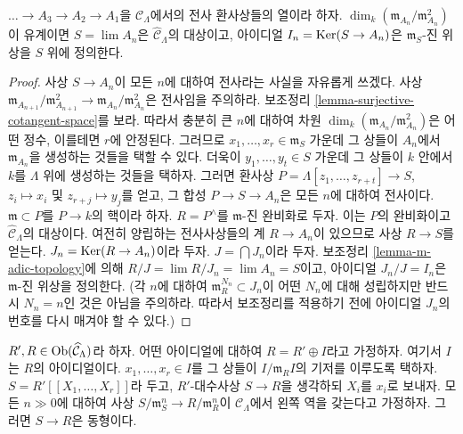 \begin{lemma}
\label{lemma-limit-artinian}
$\ldots \to A_3 \to A_2 \to A_1$을 $\mathcal{C}_\Lambda$에서의
전사 환사상들의 열이라 하자.
$\dim_k (\mathfrak m_{A_n}/\mathfrak m_{A_n}^2)$이 유계이면
$S = \lim A_n$은 $\widehat{\mathcal{C}}_\Lambda$의 대상이고,
아이디얼 $I_n = \mathop{\mathrm{Ker}}(S \to A_n)$은 $\mathfrak m_S$-진 위상을
$S$ 위에 정의한다.
\end{lemma}

\begin{proof}
사상 $S \to A_n$이 모든 $n$에 대하여 전사라는 사실을 자유롭게 쓰겠다.
사상
$\mathfrak m_{A_{n + 1}}/\mathfrak m_{A_{n + 1}}^2 \to
\mathfrak m_{A_n}/\mathfrak m_{A_n}^2$은 전사임을 주의하라.
보조정리 \ref{lemma-surjective-cotangent-space}를 보라.
따라서 충분히 큰 $n$에 대하여 차원
$\dim_k (\mathfrak m_{A_n}/\mathfrak m_{A_n}^2)$은 어떤 정수,
이를테면 $r$에 안정된다.
그러므로 $x_1, \ldots, x_r \in \mathfrak m_S$ 가운데 그 상들이
$A_n$에서 $\mathfrak m_{A_n}$을 생성하는 것들을 택할 수 있다.
더욱이 $y_1, \ldots, y_t \in S$ 가운데 그 상들이 $k$ 안에서
$k$를 $\Lambda$ 위에 생성하는 것들을 택하자. 그러면 환사상
$P = \Lambda[z_1, \ldots, z_{r + t}] \to S$, $z_i \mapsto x_i$ 및
$z_{r + j} \mapsto y_j$를 얻고, 그 합성
$P \to S \to A_n$은 모든 $n$에 대하여 전사이다.
$\mathfrak m \subset P$를 $P \to k$의 핵이라 하자.
$R = P^\wedge$를 $\mathfrak m$-진 완비화로 두자. 이는 $P$의
완비화이고 $\widehat{\mathcal{C}}_\Lambda$의 대상이다.
여전히 양립하는 전사사상들의 계 $R \to A_n$이 있으므로
사상 $R \to S$를 얻는다. $J_n = \mathop{\mathrm{Ker}}(R \to A_n)$이라 두자.
$J = \bigcap J_n$이라 두자. 보조정리
\ref{lemma-m-adic-topology}에 의해
$R/J = \lim R/J_n = \lim A_n = S$이고,
아이디얼 $J_n/J = I_n$은 $\mathfrak m$-진 위상을 정의한다.
(각 $n$에 대하여 $\mathfrak m_R^{N_n} \subset J_n$이 어떤 $N_n$에 대해
성립하지만 반드시 $N_n = n$인 것은
아님을 주의하라. 따라서 보조정리를 적용하기 전에 아이디얼
$J_n$의 번호를 다시 매겨야 할 수 있다.)
\end{proof}

\begin{lemma}
\label{lemma-power-series}
$R', R \in \mathop{\mathrm{Ob}}\nolimits(\widehat{\mathcal{C}}_\Lambda)$라 하자.
어떤 아이디얼에 대하여 $R = R' \oplus I$라고 가정하자.
여기서 $I$는 $R$의 아이디얼이다.
$x_1, \ldots, x_r \in I$를 그 상들이 $I/\mathfrak m_R I$의
기저를 이루도록 택하자. $S = R'[[X_1, \ldots, X_r]]$라 두고,
$R'$-대수사상 $S \to R$을 생각하되 $X_i$를 $x_i$로 보내자.
모든 $n \gg 0$에 대하여 사상
$S/\mathfrak m_S^n \to R/\mathfrak m_R^n$이
$\mathcal{C}_\Lambda$에서 왼쪽 역을 갖는다고 가정하자.
그러면 $S \to R$은 동형이다.
\end{lemma}

